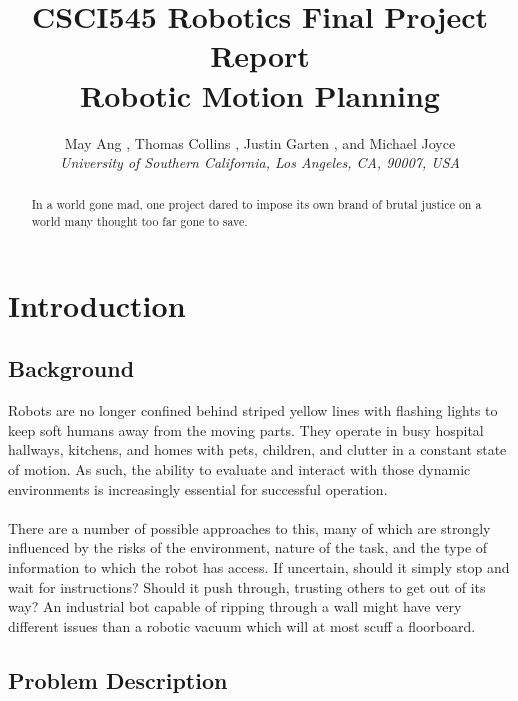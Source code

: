\documentclass{aiaa-tc}%
\begin{document}
\title{CSCI545 Robotics Final Project Report\\
	Robotic Motion Planning}

 \author
{		May Ang%
		\hspace{3pt},
		Thomas Collins%
		\hspace{3pt},
		Justin Garten%
		\hspace{3pt},
		and Michael Joyce%
		\\
		\normalsize\itshape
		University of Southern California, Los Angeles, CA, 90007, USA\\
}
\maketitle

\begin{abstract}
In a world gone mad, one project dared to impose its own brand of
brutal justice on a world many thought too far gone to save.
\end{abstract}

\section{Introduction}
\label{Introduction}

\subsection{Background}

Robots are no longer confined behind striped yellow lines
with flashing lights to keep soft humans away from the moving
parts. They operate in busy hospital hallways, kitchens, and homes
with pets, children, and clutter in a constant state of motion. As
such, the ability to evaluate and interact with those dynamic environments is
increasingly essential for successful operation. \\ \\
There are a number of possible approaches to this, many of which are
strongly influenced by the risks of the environment, nature of the
task, and the type of information to which the robot has
access. If uncertain, should it simply stop and wait for instructions?
Should it push through, trusting others to get out of its way? An
industrial bot capable of ripping through a wall might have very
different issues than a robotic vacuum which will at most scuff a
floorboard.
\subsection{Problem Description}
\end{document}
